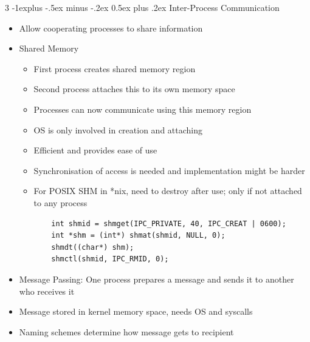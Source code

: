 \documentclass[10pt, landscape]{article}
\makeatletter
\renewcommand{\section}{\@startsection{section}{1}{0mm}%
                                {-1ex plus -.5ex minus -.2ex}%
                                {0.5ex plus .2ex}%
                                {\normalfont\large\bfseries}}
\renewcommand{\section}{\@startsection{section}{2}{0mm}%
                                {-1explus -.5ex minus -.2ex}%
                                {0.5ex plus .2ex}%
                                {\normalfont\normalsize\bfseries}}
\makeatother
\begin{document}
\begin{multicols*}{3}
\section{Inter-Process Communication}
\begin{itemize}
    \item Allow cooperating processes to share information
    \item Shared Memory
    \begin{itemize}
        \item First process creates shared memory region
        \item Second process attaches this to its own memory space
        \item Processes can now communicate using this memory region
        \item OS is only involved in creation and attaching
        \item Efficient and provides ease of use
        \item Synchronisation of access is needed and implementation might be harder
        \item For POSIX SHM in *nix, need to destroy after use; only if not attached to any process
        \begin{verbatim}
    int shmid = shmget(IPC_PRIVATE, 40, IPC_CREAT | 0600);
    int *shm = (int*) shmat(shmid, NULL, 0);
    shmdt((char*) shm);
    shmctl(shmid, IPC_RMID, 0);
        \end{verbatim}
    \end{itemize}
    \item Message Passing: One process prepares a message and sends it to another who receives it
    \item Message stored in kernel memory space, needs OS and syscalls
    \item Naming schemes determine how message gets to recipient

\end{itemize}
\end{multicols*}
\end{document}
